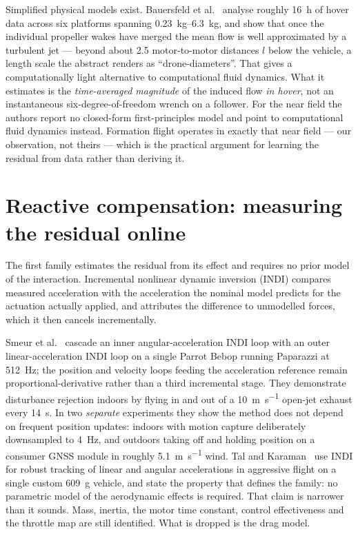 Simplified physical models exist. Bauersfeld et al.~\cite{bauersfeld2024airflow} analyse roughly
\SI{16}{\hour} of hover data across six platforms spanning \SIrange{0.23}{6.3}{\kilo\gram}, and
show that once the individual propeller wakes have merged the mean flow is well approximated by a
turbulent jet --- beyond about \num{2.5} motor-to-motor distances $l$ below the vehicle, a length
scale the abstract renders as ``drone-diameters''. That gives a computationally light alternative
to computational fluid dynamics. What it estimates is the \emph{time-averaged magnitude} of the
induced flow \emph{in hover}, not an instantaneous six-degree-of-freedom wrench on a follower. For
the near field the authors report no closed-form first-principles model and point to computational
fluid dynamics instead. Formation flight operates in exactly that near field --- our observation,
not theirs --- which is the practical argument for learning the residual from data rather than
deriving it.

\section{Reactive compensation: measuring the residual online}
\label{sec:rw-reactive}

The first family estimates the residual from its effect and requires no prior model of the
interaction. Incremental nonlinear dynamic inversion (INDI) compares measured acceleration with the
acceleration the nominal model predicts for the actuation actually applied, and attributes the
difference to unmodelled forces, which it then cancels incrementally.

Smeur et al.~\cite{smeur2017cascadedindi} cascade an inner angular-acceleration INDI loop with an
outer linear-acceleration INDI loop on a single Parrot Bebop running Paparazzi at
\SI{512}{\hertz}; the position and velocity loops feeding the acceleration reference remain
proportional-derivative rather than a third incremental stage. They demonstrate disturbance
rejection indoors by flying in and out of a \SI{10}{\metre\per\second} open-jet exhaust every
\SI{14}{\second}. In two \emph{separate} experiments they show the method does not depend on
frequent position updates: indoors with motion capture deliberately downsampled to \SI{4}{\hertz},
and outdoors taking off and holding position on a consumer GNSS module in roughly
\SI{5.1}{\metre\per\second} wind. Tal and Karaman~\cite{tal2018indi} use INDI for robust tracking of
linear and angular accelerations in aggressive flight on a single custom \SI{609}{\gram} vehicle,
and state the property that defines the family: no parametric model of the aerodynamic effects is
required. That claim is narrower than it sounds. Mass, inertia, the motor time constant, control
effectiveness and the throttle map are still identified. What is dropped is the drag model.

